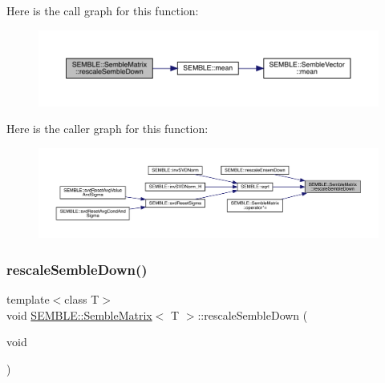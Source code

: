 Here is the call graph for this function\+:
\nopagebreak
\begin{figure}[H]
\begin{center}
\leavevmode
\includegraphics[width=350pt]{df/d87/structSEMBLE_1_1SembleMatrix_a4d2124fd0ca69d6e0759080eb4aec67b_cgraph}
\end{center}
\end{figure}
Here is the caller graph for this function\+:
\nopagebreak
\begin{figure}[H]
\begin{center}
\leavevmode
\includegraphics[width=350pt]{df/d87/structSEMBLE_1_1SembleMatrix_a4d2124fd0ca69d6e0759080eb4aec67b_icgraph}
\end{center}
\end{figure}
\mbox{\label{structSEMBLE_1_1SembleMatrix_a4d2124fd0ca69d6e0759080eb4aec67b}} 
\subsubsection{\texorpdfstring{rescaleSembleDown()}{rescaleSembleDown()}\hspace{0.1cm}{\footnotesize\ttfamily [2/2]}}
{\footnotesize\ttfamily template$<$class T$>$ \\
void \mbox{\hyperlink{structSEMBLE_1_1SembleMatrix}{S\+E\+M\+B\+L\+E\+::\+Semble\+Matrix}}$<$ T $>$\+::rescale\+Semble\+Down (\begin{DoxyParamCaption}\item[{void}]{ }\end{DoxyParamCaption})}

